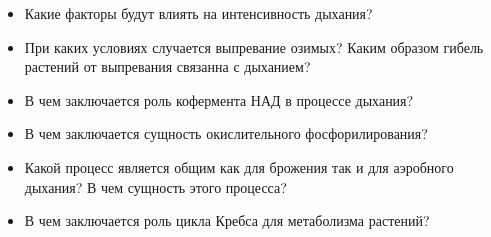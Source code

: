 \begin{itemize}
	\item Какие факторы будут влиять на интенсивность дыхания?
	\item При каких условиях случается выпревание озимых? Каким образом гибель растений от выпревания связанна с дыханием?
	\item В чем заключается роль кофермента НАД в процессе дыхания?
	\item В чем заключается сущность окислительного фосфорилирования?
	\item Какой процесс является общим как для брожения так и для аэробного дыхания? В чем сущность этого процесса?
	\item В чем заключается роль цикла Кребса для метаболизма растений?
\end{itemize}







